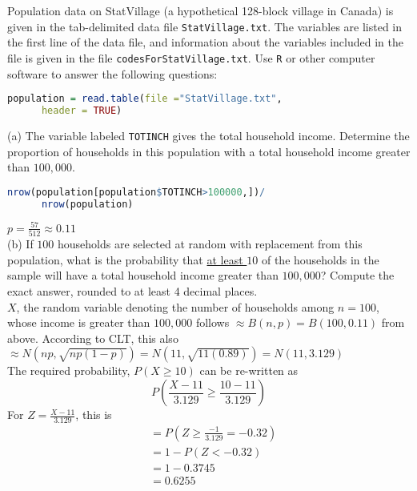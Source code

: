 \documentclass[boxes, qed]{homework}
\begin{document}
\newenvironment{amatrix}[1]{%
  \left[\begin{array}{@{}*{#1}{c}|c@{}}
}{%
  \end{array}\right]
}

\newenvironment{augmatrix}[1]{%
  \left[\begin{array}{#1}
}{%
  \end{array}\right]
}

\begin{problem}
\end{problem}
\begin{solution}
\end{solution}

\begin{problem}Population data on StatVillage (a hypothetical 128-block village in Canada) is given in
  the tab-delimited data file \texttt{StatVillage.txt}. The variables are listed in the first line of the data file, and
  information about the variables included in the file is given in the file \texttt{codesForStatVillage.txt}. 
  Use \texttt{R} or other computer software to answer the following questions:
  \begin{lstlisting}[backgroundcolor = \color{lightgray},language = R]
    population = read.table(file ="StatVillage.txt", 
      header = TRUE)
  \end{lstlisting}
\end{problem}
\begin{solution}(a) The variable labeled \texttt{TOTINCH} gives the total household income. Determine the proportion of
  households in this population with a total household income greater than $100,000$.
  \begin{lstlisting}[backgroundcolor = \color{lightgray},language = R]
    nrow(population[population$TOTINCH>100000,])/
      nrow(population)
    \end{lstlisting}
    $\boxed{p=\frac{57}{512}\approx{0.11}}$\\

  (b) If $100$ households are selected at random with replacement from this population, what is the
  probability that \underline{at least $10$} of the households in the sample will have a total household income greater
  than $100,000$? Compute the exact answer, rounded to at least 4 decimal places.\\
  
  $X$, the random variable denoting the number of households among $n=100$, 
  whose income is greater than $100,000$ follows $\approx B(n,p) = B(100,0.11)$ from above.
  According to CLT, this also $\approx N(np,\sqrt{np(1-p)}) 
    =N(11,\sqrt{11(0.89)})
    =N(11,3.129)$\\

  The required probability, $P(X\ge{10})$ can be re-written as
  $$P(\frac{X-11}{3.129}\ge{\frac{10-11}{3.129}})$$
  For $Z=\frac{X-11}{3.129}$, this is
  \begin{align*}
    &= P(Z\ge\frac{-1}{3.129}=-0.32)\\
    &= 1-P(Z<-0.32)\\
    &= 1-0.3745\\
    &= \boxed{0.6255}
  \end{align*}
\end{solution}
\end{document}
